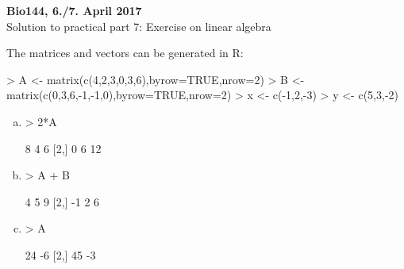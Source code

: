 \documentclass[a4paper,12pt]{scrartcl}
\begin{document}
\begin{center}
{\bf Bio144, 6./7. April 2017} \\[8mm] 
{\large Solution to practical part 7: Exercise on linear algebra}\\[10mm]
\end{center}

 

The matrices and vectors can be generated in R:\\

\begin{Schunk}
\begin{Sinput}
> A <- matrix(c(4,2,3,0,3,6),byrow=TRUE,nrow=2)
> B <- matrix(c(0,3,6,-1,-1,0),byrow=TRUE,nrow=2)
> x <- c(-1,2,-3)
> y <- c(5,3,-2)
\end{Sinput}
\end{Schunk}

\begin{enumerate}[a)]
\item 
\begin{Schunk}
\begin{Sinput}
> 2*A
\end{Sinput}
\begin{Soutput}
     [,1] [,2] [,3]
[1,]    8    4    6
[2,]    0    6   12
\end{Soutput}
\end{Schunk}
\item 
\begin{Schunk}
\begin{Sinput}
> A + B
\end{Sinput}
\begin{Soutput}
     [,1] [,2] [,3]
[1,]    4    5    9
[2,]   -1    2    6
\end{Soutput}
\end{Schunk}
\item
\begin{Schunk}
\begin{Sinput}
> A%*%t(B)
\end{Sinput}
\begin{Soutput}
     [,1] [,2]
[1,]   24   -6
[2,]   45   -3
\end{Soutput}
\end{Schunk}
\end{enumerate}
\end{document}
